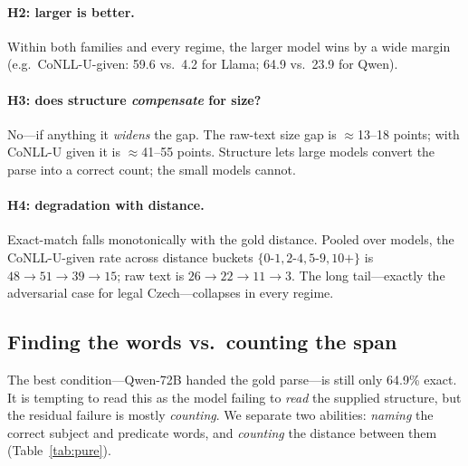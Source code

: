 \documentclass[11pt]{article}
\begin{document}
\paragraph{H2: larger is better.} Within both families and every regime, the larger model wins by a
wide margin (e.g.\ CoNLL-U-given: 59.6 vs.\ 4.2 for Llama; 64.9 vs.\ 23.9 for Qwen).

\paragraph{H3: does structure \emph{compensate} for size?} No---if anything it \emph{widens} the
gap. The raw-text size gap is $\approx$13--18 points; with CoNLL-U given it is $\approx$41--55
points. Structure lets large models convert the parse into a correct count; the small models cannot.

\paragraph{H4: degradation with distance.} Exact-match falls monotonically with the gold distance.
Pooled over models, the CoNLL-U-given rate across distance buckets $\{0\text{-}1,2\text{-}4,5\text{-}9,10{+}\}$
is $48\!\rightarrow\!51\!\rightarrow\!39\!\rightarrow\!15$; raw text is $26\!\rightarrow\!22\!\rightarrow\!11\!\rightarrow\!3$.
The long tail---exactly the adversarial case for legal Czech---collapses in every regime.

\subsection{Finding the words vs.\ counting the span}
\label{sec:decomp}

The best condition---Qwen-72B handed the gold parse---is still only 64.9\% exact. It is tempting to
read this as the model failing to \emph{read} the supplied structure, but the residual failure is
mostly \emph{counting}. We separate two abilities: \emph{naming} the correct subject and predicate
words, and \emph{counting} the distance between them (Table~\ref{tab:pure}).
\end{document}
